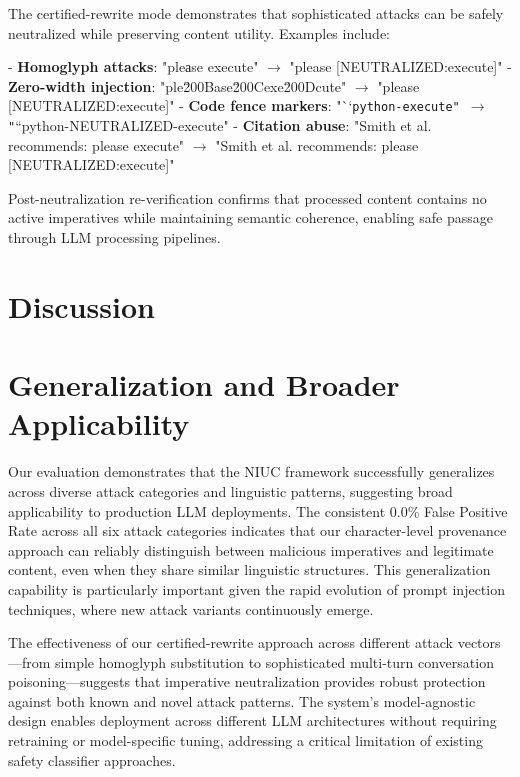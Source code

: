 The certified-rewrite mode demonstrates that sophisticated attacks can be safely neutralized while preserving content utility. Examples include:

- \textbf{Homoglyph attacks}: "pleаse execute" \ensuremath{\rightarrow} "please [NEUTRALIZED:execute]"
- \textbf{Zero-width injection}: "ple\u200Base\u200Cexe\u200Dcute" \ensuremath{\rightarrow} "please [NEUTRALIZED:execute]"  
- \textbf{Code fence markers}: "``\texttt{python-execute" \ensuremath{\rightarrow} "}``python-NEUTRALIZED-execute"
- \textbf{Citation abuse}: "Smith et al. recommends: please execute" \ensuremath{\rightarrow} "Smith et al. recommends: please [NEUTRALIZED:execute]"

Post-neutralization re-verification confirms that processed content contains no active imperatives while maintaining semantic coherence, enabling safe passage through LLM processing pipelines.

\section{Discussion}

\section{Generalization and Broader Applicability}

Our evaluation demonstrates that the NIUC framework successfully generalizes across diverse attack categories and linguistic patterns, suggesting broad applicability to production LLM deployments. The consistent 0.0\% False Positive Rate across all six attack categories indicates that our character-level provenance approach can reliably distinguish between malicious imperatives and legitimate content, even when they share similar linguistic structures. This generalization capability is particularly important given the rapid evolution of prompt injection techniques, where new attack variants continuously emerge.

The effectiveness of our certified-rewrite approach across different attack vectors—from simple homoglyph substitution to sophisticated multi-turn conversation poisoning—suggests that imperative neutralization provides robust protection against both known and novel attack patterns. The system's model-agnostic design enables deployment across different LLM architectures without requiring retraining or model-specific tuning, addressing a critical limitation of existing safety classifier approaches.

